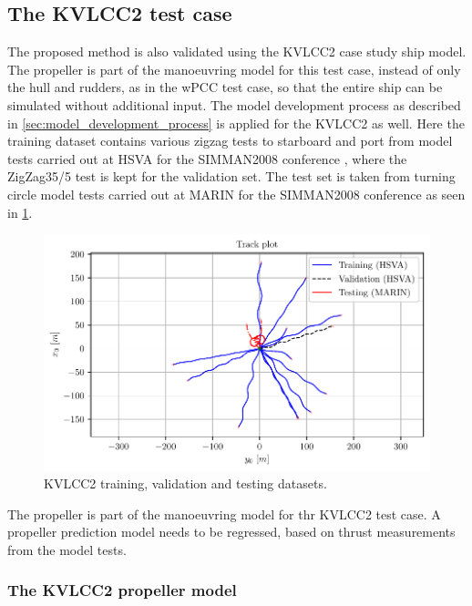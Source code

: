 

\subsection{The KVLCC2 test case}
\label{\detokenize{05.01_case_studies:the-kvlcc2-test-scenarios}}

The proposed method is also validated using the KVLCC2 case study ship model.
The propeller is part of the manoeuvring model for this test case, instead of only the hull and rudders, as in the wPCC test case, so that the entire ship can be simulated without additional input.
The model development process as described in \autoref{sec:model_development_process} is applied for the KVLCC2 as well.
Here the training dataset contains various zigzag tests to starboard and port from model tests carried out at HSVA for the SIMMAN2008 conference \cite{stern_experience_2011}, where the ZigZag35/5 test is kept for the validation set. The test set is taken from turning circle model tests carried out at MARIN for the SIMMAN2008 conference \cite{stern_experience_2011} as seen in \ref{fig:kvlcc2_datasets}.

\begin{figure}[!htb]
\centering
\includegraphics[width=\linewidth]{kappa/images/4.pdf}
\caption{KVLCC2 training, validation and testing datasets.}\label{fig:kvlcc2_datasets}\end{figure}

The propeller is part of the manoeuvring model for thr KVLCC2 test case. A propeller prediction model needs to be regressed, based on thrust measurements from the model tests.


\subsubsection{The KVLCC2 propeller model}
\label{\detokenize{06.20_results_kvlcc2:the-kvlcc2-propeller-model}}\label{\detokenize{06.20_results_kvlcc2:results-propeller-model}}

